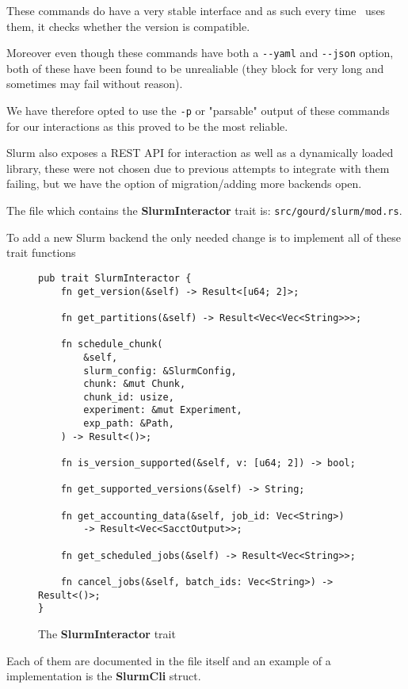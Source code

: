 These commands do have a very stable interface and as such every time
\gourd\ uses them, it checks whether the version is compatible.

Moreover even though these commands have both a \texttt{-{}-yaml} and \texttt{-{}-json}
option, both of these have been found to be unrealiable (they block for very long and
sometimes may fail without reason).

We have therefore opted to use the \texttt{-p} or "parsable" output of these commands
for our interactions as this proved to be the most reliable.

Slurm also exposes a REST API for interaction as well as a dynamically loaded library,
these were not chosen due to previous attempts to integrate with them failing,
but we have the option of migration/adding more backends open.

The file which contains the \textbf{SlurmInteractor} trait is:
\texttt{src/gourd/slurm/mod.rs}.

To add a new Slurm backend the only needed change is to implement all of these
trait functions

\begin{figure}
  \begin{center}
    \begin{verbatim}
pub trait SlurmInteractor {
    fn get_version(&self) -> Result<[u64; 2]>;

    fn get_partitions(&self) -> Result<Vec<Vec<String>>>;

    fn schedule_chunk(
        &self,
        slurm_config: &SlurmConfig,
        chunk: &mut Chunk,
        chunk_id: usize,
        experiment: &mut Experiment,
        exp_path: &Path,
    ) -> Result<()>;

    fn is_version_supported(&self, v: [u64; 2]) -> bool;

    fn get_supported_versions(&self) -> String;

    fn get_accounting_data(&self, job_id: Vec<String>)
        -> Result<Vec<SacctOutput>>;

    fn get_scheduled_jobs(&self) -> Result<Vec<String>>;

    fn cancel_jobs(&self, batch_ids: Vec<String>) -> Result<()>;
}
    \end{verbatim}
  \end{center}
  \caption{The \textbf{SlurmInteractor} trait}
\end{figure}

Each of them are documented in the file itself and
an example of a implementation is the \textbf{SlurmCli} struct.

